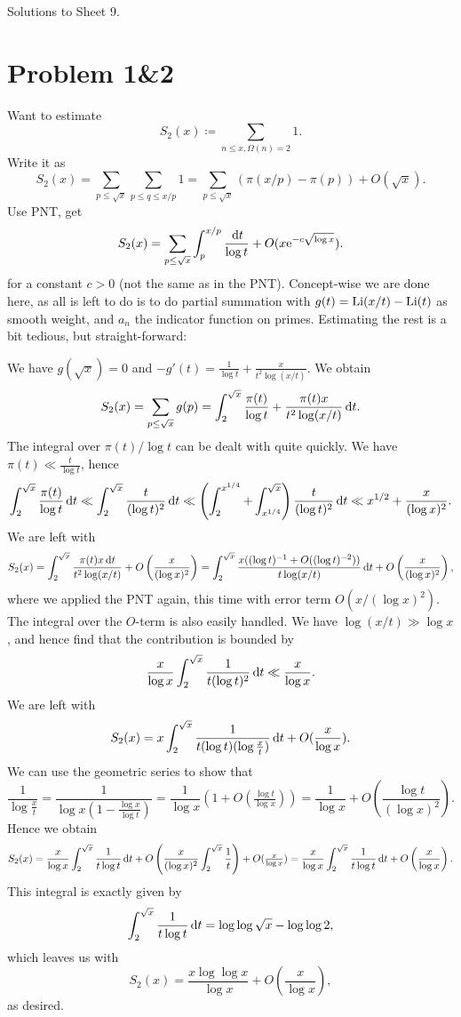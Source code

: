 \documentclass[a4paper,11pt]{article}
\author{Max von Consbruch}
\begin{document}
\begin{center}
    \huge{Solutions to Sheet 9.}
\end{center}

\section*{Problem 1\&2}

Want to estimate
\[
    S_2(x) \coloneqq \sum_{n \leq x, \Omega(n) = 2} 1.
\]
Write it as 
\[
    S_2(x) = \sum_{p \leq \sqrt x} \sum_{p \leq q \leq x/p} 1 =
    \sum_{p \leq \sqrt x} \left(\pi(x/p) - \pi(p)\right) + O(\sqrt x).
\]
Use PNT, get 
\[
    S_2(x) = \sum_{p \leq \sqrt x} \int_p^{x/p} \frac {\mathrm{\,d} t}{\log t} +
    O(x \mathrm e^{-c\sqrt{\log x}} ).
\]
for a constant $c>0$ (not the same as in the PNT).
Concept-wise we are done here, as all is left to do is to do partial summation
with $g(t) = \mathrm{Li}(x/t) - \mathrm{Li}(t)$ as smooth weight, and $a_n$ the indicator
function on primes. Estimating the rest is a bit tedious, but straight-forward:

We have $g(\sqrt x) = 0$ and $-g'(t) = \frac 1 {\log t} + \frac{x}{t^2
\log(x/t)}$. We obtain
\[
    S_2(x) = \sum_{p \leq \sqrt x} g(p) = 
    \int_2^{\sqrt x} \frac{\pi(t)}{\log t} + \frac{\pi(t) x}{t^2 \log(x/t)}
    \mathrm{\,d} t.
\]
The integral over $\pi(t)/\log t$ can be dealt with quite quickly. We have 
$\pi(t) \ll \frac t{\log t}$, hence
\[
    \int_2^{\sqrt x} \frac{\pi(t)}{\log t} \mathrm{\,d} t
    \ll \int_2^{\sqrt x} \frac t{(\log t)^2} \mathrm{\,d} t
    \ll \left( \int_{2}^{x^{1/4}} + 
    \int_{x^{1/4}}^{\sqrt x} \right )\frac{t}{(\log t)^2} \mathrm{\,d} t 
    \ll x^{1/2} + \frac x{(\log x)^2}.
\]
We are left with
\[
    S_2(x) = \int_2^{\sqrt x} \frac{\pi(t) x \mathrm{\,d} t}{t^2 \log(x/t)} + O\left(\frac x
    {(\log x)^2}\right) = \int_2^{\sqrt x} \frac{x((\log t)^{-1} + O((\log t)^{-2}))}{t
\log(x/t)} \mathrm{\,d} t + O\left(\frac x{(\log x)^2}\right),
\]
where we applied the PNT again, this time with error term $O(x/(\log x)^2)$. 
The integral over the $O$-term is also easily handled. We have $\log(x/t) \gg
\log x$, and hence find that the contribution is bounded by 
\[
    \frac x{\log x} \int_2^{\sqrt x} \frac 1{t (\log t)^2} \mathrm{\,d} t
    \ll \frac x{\log x}. 
\]
We are left with
\[
    S_2(x) = x \int_2^{\sqrt x} \frac 1{t (\log t)(\log \tfrac xt)} \mathrm{\,d} t 
    + O(\frac x{\log x}).
\]
We can use the geometric series to show that 
\[
    \frac 1{\log \tfrac xt} = \frac 1{\log x (1- \tfrac{\log x}{\log t})}
    = \frac 1{\log x} \left( 1 + O(\tfrac {\log t}{\log x}) \right)
    = \frac 1 {\log x} + O\left(\frac{\log t}{(\log x)^2} \right).
\]
Hence we obtain
\[
    S_2(x) = \frac x{\log x} \int_2^{\sqrt x} \frac 1{t \log t} \mathrm{\,d} t
    + O\left(\frac x{(\log x)^2} \int_2^{\sqrt x} \frac 1t \right)+ O(\tfrac x{\log x}) 
    = \frac x{\log x} \int_2^{\sqrt x} \frac 1{t \log t} \mathrm{\,d} t + O\left( \frac
    {x}{\log x} \right).
\]
This integral is exactly given by 
\[
    \int_2^{\sqrt x} \frac 1{t \log t} \mathrm{\,d} t = 
    \log \log \sqrt x - \log \log 2,
\]
which leaves us with
\[
    S_2(x) = \frac{x \log \log x}{\log x} + O\left( \frac x{\log x}\right),
\]
as desired.
\end{document}
